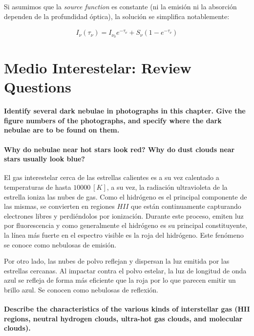 \documentclass{tufte-handout}
\begin{document}
Si asumimos que la \emph{source function} es constante (ni la emisión ni la absorción dependen de la profundidad óptica), la solución se simplifica notablemente:

\begin{align}
I_\nu(\tau_\nu) = I_{\nu_0}e^{-\tau_\nu} + S_\nu (1-e^{-\tau_\nu})
\end{align}

\section{Medio Interestelar: Review Questions}

\paragraph{Identify several dark nebulae in photographs in this chapter. Give the figure numbers of the photographs,
and specify where the dark nebulae are to be found on them.}

\paragraph{\textbf{Why do nebulae near hot stars look red? Why do dust clouds near stars usually look blue?}}

El gas interestelar cerca de las estrellas calientes es a su vez calentado a temperaturas de hasta $10000~[K]$, a su vez, la radiación ultravioleta de la estrella ioniza las nubes de gas. Como el hidrógeno es el principal componente de las mismas, se convierten en regiones $HII$ que están continuamente capturando electrones libres y perdiéndolos por ionización. Durante este proceso, emiten luz por fluorescencia y como generalmente el hidrógeno es su principal constituyente, la línea más fuerte en el espectro visible es la roja del hidrógeno. Este fenómeno se conoce como nebulosas de emisión.

Por otro lado, las nubes de polvo reflejan y dispersan la luz emitida por las estrellas cercanas. Al impactar contra el polvo estelar, la luz de longitud de onda azul se refleja de forma más eficiente que la roja por lo que parecen emitir un brillo azul. Se conocen como nebulosas de reflexión.

\paragraph{\textbf{Describe the characteristics of the various kinds of interstellar gas (HII regions, neutral hydrogen clouds,
ultra-hot gas clouds, and molecular clouds).}}
\end{document}
